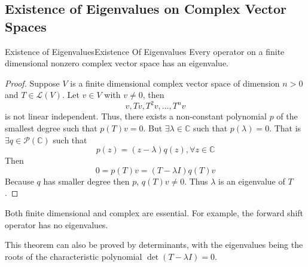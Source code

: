 \documentclass[../main.tex]{subfiles}
\begin{document}
\subsection{Existence of Eigenvalues on Complex Vector Spaces}
\begin{theorem}{Existence of Eigenvalues}{Existence Of Eigenvalues}
Every operator on a finite dimensional nonzero complex vector space has an eigenvalue.
\end{theorem}
\begin{proof}
Suppose $V$ is a finite dimensional complex vector space of dimension $n>0$ and $T\in \mathscr{L}(V)$. Let $v\in  V$ with $v\neq 0$, then
\begin{equation*}
v,Tv,T^2v, \ldots ,T^nv
\end{equation*}
is not linear independent. Thus, there exists a non-constant polynomial $p$ of the smallest degree such that $p(T)v=0$. But $\exists \lambda\in \mathbb{C}$ such that $p(\lambda)=0$. That is $\exists q\in \mathscr{P}(\mathbb{C})$ such that 
\begin{equation*}
p(z) = (z-\lambda)q(z), \forall z\in \mathbb{C}
\end{equation*}
Then
\begin{equation*}
0 = p(T)v = (T-\lambda I)q(T)v
\end{equation*}
Because $q$ has smaller degree then $p$, $q(T)v\neq 0$. Thus $\lambda$ is an eigenvalue of $T$.
\end{proof}

\begin{remark}
Both finite dimensional and complex are essential. For example, the forward shift operator has no eigenvalues.

This theorem can also be proved by determinants, with the eigenvalues being the roots of the characteristic polynomial $\det (T - \lambda I) = 0$.
\end{remark}
\end{document}
